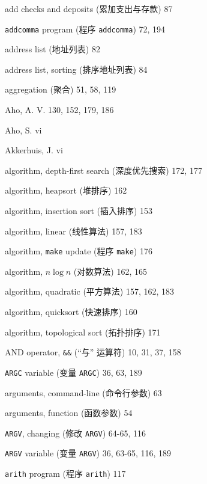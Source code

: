 \begin{multicols}{2}
\hangindent=2pc  add checks and deposits (累加支出与存款) 87

\hangindent=2pc  \verb'addcomma' program (程序 \verb'addcomma') 72, 194

\hangindent=2pc  address list (地址列表) 82

\hangindent=2pc  address list, sorting (排序地址列表) 84

\hangindent=2pc  aggregation (聚合) 51, 58, 119

\hangindent=2pc  Aho, A. V. 130, 152, 179, 186

\hangindent=2pc  Aho, S. vi

\hangindent=2pc  Akkerhuis, J. vi

\hangindent=2pc  algorithm, depth-first search (深度优先搜索) 172, 177

\hangindent=2pc  algorithm, heapsort (堆排序) 162

\hangindent=2pc  algorithm, insertion sort (插入排序) 153

\hangindent=2pc  algorithm, linear (线性算法) 157, 183

\hangindent=2pc  algorithm, \verb'make' update (程序
\verb'make') 176

\hangindent=2pc  algorithm, $n\log n$ (对数算法) 162, 165

\hangindent=2pc  algorithm, quadratic (平方算法) 157, 162, 183

\hangindent=2pc  algorithm, quicksort (快速排序) 160

\hangindent=2pc  algorithm, topological sort (拓扑排序) 171

\hangindent=2pc  AND operator, \verb'&&' (``与'' 运算符) 10, 31, 37, 158

\hangindent=2pc  \verb'ARGC' variable (变量 \verb'ARGC') 36, 63, 189

\hangindent=2pc  arguments, command-line (命令行参数) 63

\hangindent=2pc  arguments, function (函数参数) 54

\hangindent=2pc  \verb'ARGV', changing (修改 \verb'ARGV') 64-65, 116

\hangindent=2pc  \verb'ARGV' variable (变量 \verb'ARGV') 36, 63-65, 116, 189

\hangindent=2pc  \verb'arith' program (程序 \verb'arith') 117


\end{multicols}
